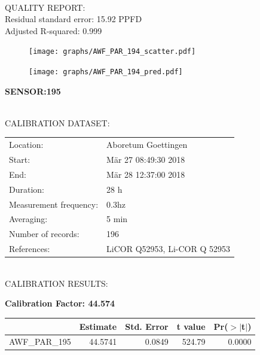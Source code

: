 \documentclass[oneside]{report}
\begin{document}
\hrulefill\\
QUALITY REPORT:\\
Residual standard error: 15.92 PPFD\\
Adjusted R-squared: 0.999



\begin{figure}[H]
  \centering
  \texttt{[image: graphs/AWF\_PAR\_194\_scatter.pdf]}
\end{figure}




\begin{figure}[H]
  \centering
  \texttt{[image: graphs/AWF\_PAR\_194\_pred.pdf]}
\end{figure}

\pagebreak


\begin{center}
\large{\textbf{SENSOR:195}}\\
\end{center}

\hrulefill\\
CALIBRATION DATASET:\\
\begin{table}[h!]
  \centering
  \label{tab:table1}
  \begin{tabular}{ll}
    Location: & Aboretum Goettingen\\ 
    
    
    Start:  & Mär 27 08:49:30 2018 \\
    End:   & Mär 28 12:37:00 2018\\ 
    Duration: & 28 h\\
    Measurement frequency: & 0.3hz\\
    Averaging:  &5 min\\
    Number of records: & 196 \\
    References: & LiCOR Q52953, Li-COR Q 52953 \\
  \end{tabular}
\end{table}

\hrulefill\\
CALIBRATION RESULTS:\\


\begin{center}
\textbf{\large{Calibration Factor: 44.574}}\\
\end{center}
\begin{table}[ht]
\centering
\begin{tabular}{rrrrr}
  \hline
 & Estimate & Std. Error & t value & Pr($>$$|$t$|$) \\ 
  \hline
AWF\_PAR\_195 & 44.5741 & 0.0849 & 524.79 & 0.0000 \\ 
   \hline
\end{tabular}
\end{table}
\end{document}
